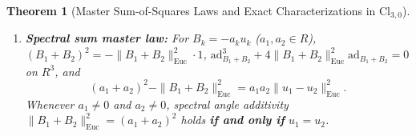 \documentclass[11pt]{article}
\newtheorem{theorem}{Theorem}[section]
\theoremstyle{definition}
\newcommand{\Cl}{\mathrm{Cl}}
\newcommand{\ad}{\mathrm{ad}}
\newcommand{\Euc}{\mathrm{Euc}}
\begin{document}
\begin{theorem}[Master Sum-of-Squares Laws and Exact Characterizations in $\Cl_{3,0}$]
\begin{enumerate}
    Over $\mathbb{R}$, since $(B_1 + B_2)^2 = -\|B_1 + B_2\|_{\Euc}^2 \cdot 1 \in \mathbb{R}$,
    $\exp(B_1 + B_2) \in \mathbb{R}\cdot 1 \oplus \mathrm{span}_{\mathbb{R}}(u_1, u_2)$; thus
    \eqref{eq:subalg-obstruction} implies $\exp(B_1)\exp(B_2) \neq \exp(B_1 + B_2)$ whenever
    $\sin(\theta_1/2) \neq 0$, $\sin(\theta_2/2) \neq 0$, and $u_1 \neq \pm u_2$.
  \item \textbf{Spectral sum master law:} For $B_k = -a_k u_k$ ($a_1, a_2 \in R$),
    $(B_1 + B_2)^2 = -\|B_1 + B_2\|_{\Euc}^2 \cdot 1$, $\ad_{B_1 + B_2}^3 +
    4\|B_1 + B_2\|_{\Euc}^2 \ad_{B_1 + B_2} = 0$ on $R^3$, and
    \begin{equation}\label{eq:master-spectral}
      (a_1 + a_2)^2 - \|B_1 + B_2\|_{\Euc}^2 = a_1 a_2 \|u_1 - u_2\|_{\Euc}^2.
    \end{equation}
    Whenever $a_1 \neq 0$ and $a_2 \neq 0$, spectral angle additivity
    $\|B_1 + B_2\|_{\Euc}^2 = (a_1 + a_2)^2$ holds \textbf{if and only if} $u_1 = u_2$.
\end{enumerate}
\end{theorem}
\end{document}
